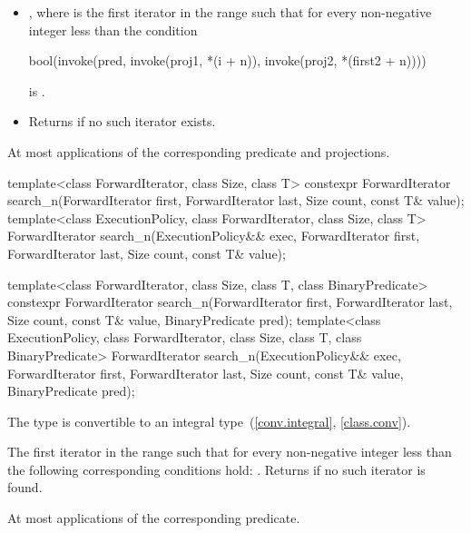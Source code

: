 \begin{itemdescr}
\pnum
\returns
\begin{itemize}
\item
  ,
  where  is
  the first iterator in the range 
  such that
  for every non-negative integer  less than 
  the condition
\begin{codeblock}
bool(invoke(pred, invoke(proj1, *(i + n)), invoke(proj2, *(first2 + n))))
\end{codeblock}
  is .
\item
  Returns  if no such iterator exists.
\end{itemize}

\pnum
\complexity
At most  applications
of the corresponding predicate and projections.
\end{itemdescr}

%
\begin{itemdecl}
template<class ForwardIterator, class Size, class T>
  constexpr ForwardIterator
    search_n(ForwardIterator first, ForwardIterator last,
             Size count, const T& value);
template<class ExecutionPolicy, class ForwardIterator, class Size, class T>
  ForwardIterator
    search_n(ExecutionPolicy&& exec,
             ForwardIterator first, ForwardIterator last,
             Size count, const T& value);

template<class ForwardIterator, class Size, class T,
         class BinaryPredicate>
  constexpr ForwardIterator
    search_n(ForwardIterator first, ForwardIterator last,
             Size count, const T& value,
             BinaryPredicate pred);
template<class ExecutionPolicy, class ForwardIterator, class Size, class T,
         class BinaryPredicate>
  ForwardIterator
    search_n(ExecutionPolicy&& exec,
             ForwardIterator first, ForwardIterator last,
             Size count, const T& value,
             BinaryPredicate pred);
\end{itemdecl}

\begin{itemdescr}

\pnum
\mandates
The type 
is convertible to an integral type~(\ref{conv.integral}, \ref{class.conv}).

\pnum
\returns
The first iterator  in the range 
such that for every non-negative integer  less than 
the following corresponding conditions hold:
.
Returns  if no such iterator is found.

\pnum
\complexity
At most  applications of the corresponding predicate.
\end{itemdescr}

